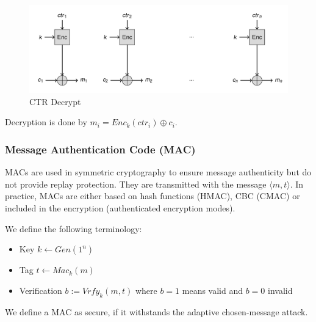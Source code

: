 \begin{figure}[H]
  \centering
  \includegraphics[width=.8\textwidth]{figures/ctr_decrypt.png}
  \caption{CTR Decrypt}
\end{figure}
Decryption is done by $m_i = Enc_k(ctr_i) \oplus c_i$.

\subsubsection{Message Authentication Code (MAC)}
MACs are used in symmetric cryptography to ensure message authenticity but do not provide replay protection.
They are transmitted with the message $\langle m,t \rangle$.
In practice, MACs are either based on hash functions (HMAC), CBC (CMAC) or included in the encryption (authenticated encryption modes).

We define the following terminology:
\begin{itemize}[noitemsep,topsep=0pt]
  \item Key $k \leftarrow Gen(1^n)$
  \item Tag $t \leftarrow Mac_k(m)$
  \item Verification $b := Vrfy_k(m,t)$ where $b=1$ means valid and $b=0$ invalid
\end{itemize}

We define a MAC as secure, if it withstands the adaptive chosen-message attack.

